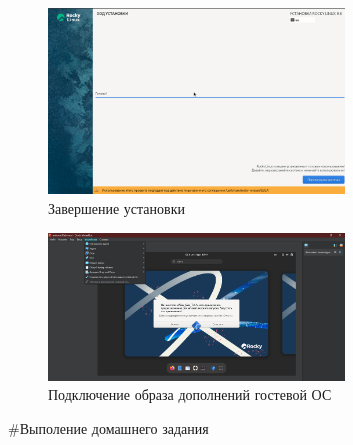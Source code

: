 \documentclass[
  12pt,
  a4paper,
  DIV=11,
  numbers=noendperiod]{scrreprt}
\begin{document}
\begin{figure}

{\centering \includegraphics[width=0.7\textwidth,height=\textheight]{image/13.png}

}

\caption{Завершение установки}

\end{figure}%
\begin{figure}

{\centering \includegraphics[width=0.7\textwidth,height=\textheight]{image/14.png}

}

\caption{Подключение образа дополнений гостевой ОС}

\end{figure}%

\#Выполение домашнего задания
\end{document}
